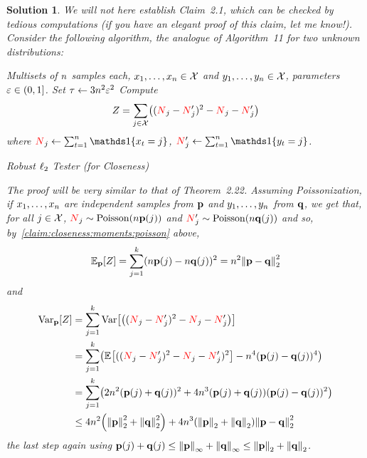 \documentclass[biber,plain]{nowfnt} %
\newtheorem{solution}{Solution}[chapter]
\newcommand{\occur}{\textcolor{red}{N}}
\newcommand{\occur}{N}
\begin{document}
\begin{solution}
We will not here establish Claim~2.1, which can be checked by tedious computations \emph{(if you have an elegant proof of this claim, let me know!)}. Consider the following algorithm, the analogue of Algorithm~11 for two unknown distributions:
\begin{algorithm}[ht!]
  \begin{algorithmic}[1]
    \Require Multisets of $\ns$ samples each, $x_1,\dots,x_\ns \in \domain$ and $y_1,\dots,y_\ns \in \domain$, parameters $\dst\in(0,1]$.
    \State Set $\tau \gets 3\ns^2\dst^2$
    \State Compute
    \[
        Z = \sum_{j\in\domain} \Paren{(\occur_j-\occur_j')^2-\occur_j-\occur_j'}
    \] where $\occur_j \gets \sum_{t=1}^\ns\indic{x_t=j}$, $\occur_j' \gets \sum_{t=1}^\ns\indic{y_t=j}$.
     \Return \reject {}
    \Else\ 
      \Return \accept {}
    \EndIf
  \end{algorithmic}
  \caption{\label{algo:l2:closeness}\sc Robust $\lp[2]$ Tester (for Closeness)}
\end{algorithm}
The proof will be very similar to that of Theorem~2.22. Assuming Poissonization, if $x_1,\dots,x_\ns$ are independent samples from $\p$ and $y_1,\dots,y_\ns$ from $\q$, we get that, for all $j\in\domain$, $\occur_j\sim\poisson{\ns\p(j)}$  and $\occur'_j\sim\poisson{\ns\q(j)}$ and so, by~\cref{claim:closeness:moments:poisson} above,
\begin{align}
	\bE{\p}{Z} = \sum_{j=1}^\ab (\ns\p(j)-\ns\q(j))^2 = \ns^2 \normtwo{\p-\q}^2
\end{align}
and
\begin{align}
	\Var_{\p}[Z] 
	&= \sum_{j=1}^\ab \Var\mleft[\Paren{(\occur_j-\occur_j')^2-\occur_j-\occur_j'}\mright] \notag\\
	&= \sum_{j=1}^\ab \Paren{ \bEE{((\occur_j-\occur_j')^2-\occur_j-\occur_j')^2} -  \ns^4(\p(j)-\q(j))^4}\notag\\
	&= \sum_{j=1}^\ab \Paren{2\ns^2(\p(j)+\q(j))^2 + 4\ns^3(\p(j)+\q(j))(\p(j)-\q(j))^2}\notag\\
	&\leq 4\ns^2\Paren{\normtwo{\p}^2+\normtwo{\q}^2} + 4\ns^3(\normtwo{\p}+\normtwo{\q})\normtwo{\p-\q}^2
\end{align}
the last step again using $\p(j)+\q(j)\leq \norminf{\p}+\norminf{\q} \leq \normtwo{\p}+\normtwo{\q}$.


\end{solution}
\end{document}
